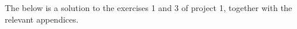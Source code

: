 \documentclass[a4paper]{article}
\begin{document}
\maketitle
\thispagestyle{first} %

\pagebreak

The below is a solution to the exercises 1 and 3 of project 1, together with
the relevant appendices.

\tableofcontents



\setcounter{section}{2}





\appendix


\end{document}
